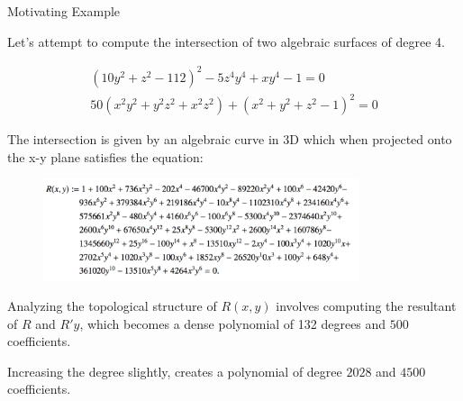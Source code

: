 \documentclass{beamer}
\begin{document}
	\begin{frame}
		\begin{center}
			\Huge Motivating Example
		\end{center}
		
		Let's attempt to compute the intersection of two algebraic surfaces of degree 4.
		
		\begin{align*}
			(10y^2 + z^2 - 112)^2 - 5z^4y^4 + xy^4 - 1 = 0 \\
			50(x^2y^2 + y^2z^2 + x^2z^2) + (x^2 + y^2 + z^2 -1)^2 = 0
		\end{align*}
	
	
		
	\end{frame}
	
	\begin{frame}
		
		The intersection is given by an algebraic curve in 3D which when projected onto the x-y plane satisfies the equation:
		
		\begin{figure}[!ht]
			\centering
			\includegraphics[width=0.825\textwidth]{../Code/Images/R_xy_proj.png}
			\label{fig:FF_book_image}
		\end{figure}
		
		Analyzing the topological structure of $R(x,y)$ involves computing the resultant of $R$ and $R'y$, which becomes a dense polynomial of 132 degrees and $500$ coefficients.
		\vspace{0.2in}
		
		Increasing the degree slightly, creates a polynomial of degree $2028$ and $4500$ coefficients.
		
		 
	\end{frame}
	
\end{document}
